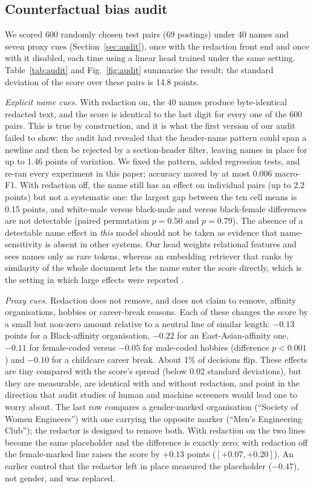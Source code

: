 \subsection{Counterfactual bias audit}
We scored 600 randomly chosen test pairs (69 postings) under 40 names and seven proxy cues
(Section~\ref{sec:audit}), once with the redaction front end and once with it disabled, each time using a
linear head trained under the same setting. Table~\ref{tab:audit} and Fig.~\ref{fig:audit} summarise the
result; the standard deviation of the score over these pairs is 14.8 points.

\emph{Explicit name cues.} With redaction on, the 40 names produce byte-identical redacted text, and the
score is identical to the last digit for every one of the 600 pairs. This is true by construction, and it
is what the first version of our audit failed to show: the audit had revealed that the header-name pattern
could span a newline and then be rejected by a section-header filter, leaving names in place for up to
1.46 points of variation. We fixed the pattern, added regression tests, and re-ran every experiment in this paper;
accuracy moved by at most 0.006 macro-F1. With redaction off, the name still has an effect on individual pairs
(up to 2.2 points) but not a systematic one: the largest gap between the ten cell means is 0.15 points, and
white-male versus black-male and versus black-female differences are not detectable (paired permutation
$p=0.50$ and $p=0.79$). The absence of a detectable name effect in \emph{this} model should not be taken as
evidence that name-sensitivity is absent in other systems. Our head weights relational features and sees names
only as rare tokens, whereas an embedding retriever that ranks by similarity of the whole document lets the name
enter the score directly, which is the setting in which large effects were reported \cite{wilson2024silicon}.

\emph{Proxy cues.} Redaction does not remove, and does not claim to remove, affinity organisations, hobbies or
career-break reasons. Each of these changes the score by a small but non-zero amount relative to a neutral line
of similar length: $-0.13$ points for a Black-affinity organisation, $-0.22$ for an East-Asian-affinity one,
$-0.11$ for female-coded versus $-0.05$ for male-coded hobbies (difference $p<0.001$) and $-0.10$ for a
childcare career break. About 1\% of decisions flip. These effects are tiny compared with the score's
spread (below 0.02 standard deviations), but they are measurable, are identical with and without redaction,
and point in the direction that audit studies of human and machine screeners would lead one to worry about.
The last row compares a gender-marked organisation (``Society of Women Engineers'') with one carrying the opposite
marker (``Men's Engineering Club''); the redactor is designed to remove both. With redaction on the two lines become
the same placeholder and the difference is exactly zero; with redaction off the female-marked line raises the score by
$+0.13$ points ($[+0.07,+0.20]$). An earlier control that the redactor left in place measured the placeholder
($-0.47$), not gender, and was replaced.

